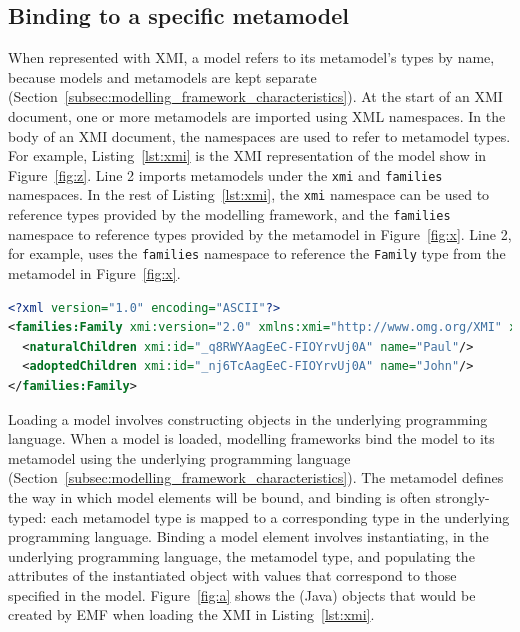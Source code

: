 \subsection{Binding to a specific metamodel}
\label{subsec:binding_specific}
When represented with XMI, a model refers to its metamodel's types by name, because models and metamodels are kept separate (Section~\ref{subsec:modelling_framework_characteristics}). At the start of an XMI document, one or more metamodels are imported using XML namespaces. In the body of an XMI document, the namespaces are used to refer to metamodel types. For example, Listing~\ref{lst:xmi} is the XMI representation of the model show in Figure~\ref{fig:z}. Line 2 imports metamodels under the \texttt{xmi} and \texttt{fa\-mi\-li\-es} namespaces. In the rest of Listing~\ref{lst:xmi}, the \texttt{xmi} namespace can be used to reference types provided by the modelling framework, and the \texttt{fa\-mi\-li\-es} namespace to reference types provided by the metamodel in Figure~\ref{fig:x}. Line 2, for example, uses the \texttt{fa\-mi\-li\-es} namespace to reference the \texttt{Fa\-mi\-ly} type from the metamodel in Figure~\ref{fig:x}. 

\begin{lstlisting}[caption=Family model in XMI, label=lst:xmi, language=XML]
<?xml version="1.0" encoding="ASCII"?>
<families:Family xmi:version="2.0" xmlns:xmi="http://www.omg.org/XMI" xmlns:families="http://www.cs.york.ac.uk/families" xmi:id="_kE2LkAagEeC-FIOYrvUj0A" name="Smiths">
  <naturalChildren xmi:id="_q8RWYAagEeC-FIOYrvUj0A" name="Paul"/>
  <adoptedChildren xmi:id="_nj6TcAagEeC-FIOYrvUj0A" name="John"/>
</families:Family>
\end{lstlisting}

Loading a model involves constructing objects in the underlying programming language. When a model is loaded, modelling frameworks bind the model to its metamodel using the underlying programming language (Section~\ref{subsec:modelling_framework_characteristics}). The metamodel defines the way in which model elements will be bound, and binding is often strongly-typed: each metamodel type is mapped to a corresponding type in the underlying programming language. Binding a model element involves instantiating, in the underlying programming language, the metamodel type, and populating the attributes of the instantiated object with values that correspond to those specified in the model. Figure~\ref{fig:a} shows the (Java) objects that would be created by EMF when loading the XMI in Listing~\ref{lst:xmi}.

